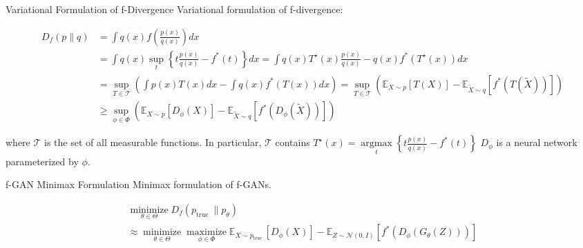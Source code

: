 \begin{frame}[allowframebreaks]

\begin{myconceptblock}{12.21}{Variational Formulation of f-Divergence}
    Variational formulation of f-divergence:

    $$
    \begin{aligned}
    D_{f}(p \| q) & =\int q(x) f\left(\frac{p(x)}{q(x)}\right) d x \\
    & =\int q(x) \sup _{t}\left\{t \frac{p(x)}{q(x)}-f^{*}(t)\right\} d x=\int q(x) T^{\star}(x) \frac{p(x)}{q(x)}-q(x) f^{*}\left(T^{\star}(x)\right) d x \\
    & =\sup _{T \in \mathcal{T}}\left(\int p(x) T(x) d x-\int q(x) f^{*}(T(x)) d x\right)=\sup _{T \in \mathcal{T}}\left(\mathbb{E}_{X \sim p}[T(X)]-\mathbb{E}_{\tilde{X} \sim q}\left[f^{*}(T(\tilde{X}))\right]\right) \\
    & \geq \sup _{\phi \in \Phi}\left(\mathbb{E}_{X \sim p}\left[D_{\phi}(X)\right]-\mathbb{E}_{\tilde{X} \sim q}\left[f^{*}\left(D_{\phi}(\tilde{X})\right)\right]\right)
    \end{aligned}
    $$

    where $\mathcal{T}$ is the set of all measurable functions. In particular, $\mathcal{T}$ contains $T^{\star}(x)=\underset{t}{\operatorname{argmax}}\left\{t \frac{p(x)}{q(x)}-f^*(t)\right\}$ $D_{\phi}$ is a neural network parameterized by $\phi$.
\end{myconceptblock}

\end{frame}

\begin{frame}[allowframebreaks]

\begin{mydefinitionblock}{12.22}{f-GAN Minimax Formulation}
    Minimax formulation of f-GANs.

    $$
    \begin{gathered}
    \underset{\theta \in \Theta}{\operatorname{minimize}} D_{f}\left(p_{\text {true }} \| p_{\theta}\right) \\
    \approx \underset{\theta \in \Theta}{\operatorname{minimize}} \underset{\phi \in \Phi}{\operatorname{maximize}} \mathbb{E}_{X \sim p_{\text {true }}}\left[D_{\phi}(X)\right]-\mathbb{E}_{Z \sim \mathcal{N}(0, I)}\left[f^{*}\left(D_{\phi}\left(G_{\theta}(Z)\right)\right)\right]
    \end{gathered}
    $$
\end{mydefinitionblock}

\end{frame}


